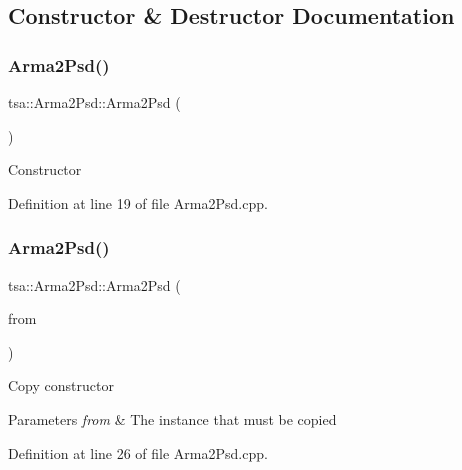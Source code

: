 \subsection{Constructor \& Destructor Documentation}
\mbox{\label{classtsa_1_1_arma2_psd_a3488311932cc240d99a8e40c124da91d}} 
\subsubsection{\texorpdfstring{Arma2\+Psd()}{Arma2Psd()}\hspace{0.1cm}{\footnotesize\ttfamily [1/2]}}
{\footnotesize\ttfamily tsa\+::\+Arma2\+Psd\+::\+Arma2\+Psd (\begin{DoxyParamCaption}{ }\end{DoxyParamCaption})}

Constructor 

Definition at line 19 of file Arma2\+Psd.\+cpp.

\mbox{\label{classtsa_1_1_arma2_psd_aa3a79a62709efcfdbb3268cf253837e1}} 
\subsubsection{\texorpdfstring{Arma2\+Psd()}{Arma2Psd()}\hspace{0.1cm}{\footnotesize\ttfamily [2/2]}}
{\footnotesize\ttfamily tsa\+::\+Arma2\+Psd\+::\+Arma2\+Psd (\begin{DoxyParamCaption}\item[{const \hyperlink{classtsa_1_1_arma2_psd}{Arma2\+Psd} \&}]{from }\end{DoxyParamCaption})}

Copy constructor


\begin{DoxyParams}{Parameters}
{\em from} & The instance that must be copied \\
\hline
\end{DoxyParams}


Definition at line 26 of file Arma2\+Psd.\+cpp.

\mbox{\label{classtsa_1_1_arma2_psd_aef3535e694289be52365ded1f83b7599}} 
